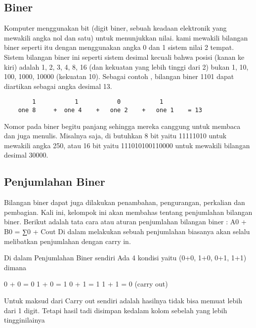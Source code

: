 \subsection {Biner}
Komputer menggunakan bit (digit biner, sebuah keadaan elektronik yang mewakili angka nol dan satu) untuk menunjukkan nilai. kami mewakili bilangan biner seperti itu dengan menggunakan angka 0 dan 1 sistem nilai 2 tempat. Sistem bilangan biner ini seperti sistem desimal kecuali bahwa posisi (kanan ke kiri) adalah 1, 2, 3, 4, 8, 16 (dan kekuatan yang lebih tinggi dari 2) bukan 1, 10, 100, 1000, 10000 (kekuatan 10). Sebagai contoh , bilangan biner 1101 dapat diartikan sebagai angka desimal 13.
\begin{verbatim}
		1			1			0			1
	one 8	  +	 one 4	  +	  one 2    +   one 1 	= 13
	\end{verbatim}
Nomor pada  biner begitu panjang sehingga mereka canggung  untuk membaca dan juga menulis. Misalnya saja, di butuhkan 8 bit yaitu  11111010 untuk mewakili angka 250, atau 16 bit yaitu 111010100110000 untuk mewakili bilangan desimal 30000.


\subsection {Penjumlahan Biner}
Bilangan biner dapat juga dilakukan penambahan, pengurangan, perkalian dan pembagian. Kali ini, kelompok ini akan membahas tentang penjumlahan bilangan biner. Berikut adalah tata cara atau aturan penjumlahan bilangan biner :
A0 + B0 = ∑0 + Cout
Di dalam melakukan sebuah penjumlahan biasanya akan selalu melibatkan penjumlahan dengan carry in.

Di dalam Penjumlahan Biner sendiri Ada 4 kondisi yaitu
(0+0, 1+0, 0+1, 1+1) dimana

0 + 0 = 0
1 + 0 = 1
0 + 1 = 1
1 + 1 = 0 (carry out) 

Untuk maksud dari Carry out sendiri adalah hasilnya tidak bisa memuat lebih dari 1 digit. Tetapi  hasil tadi disimpan kedalam kolom sebelah yang lebih tingginilainya

